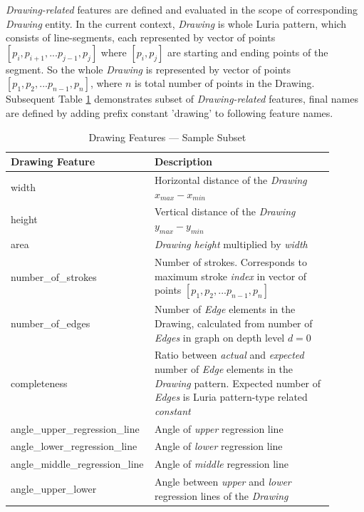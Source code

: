 \textit{Drawing-related} features are defined and evaluated in the scope of corresponding \textit{Drawing} entity. In the current context, \textit{Drawing} is whole Luria pattern, which consists of line-segments, each represented by vector of points $[p_i, p_{i+1}, ... p_{j-1}, p_j]$ where $[p_i, p_j]$ are starting and ending points of the segment. So the whole \textit{Drawing} is represented by vector of points $[p_1, p_{2}, ... p_{n-1}, p_n]$, where $n$ is total number of points in the Drawing. Subsequent Table \ref{features-drawing} demonstrates subset of \textit{Drawing-related} features, final names are defined by adding prefix constant 'drawing' to following feature names.

\begin{table}[htb]
\centering
\begin{tabular}{p{0.35\linewidth} | p{0.55\linewidth}}
\hline
Drawing Feature & Description  \\
\hline
width  & Horizontal distance of the \textit{Drawing} $x_{max} - x_{min}$  \\
height & Vertical distance of the \textit{Drawing} $y_{max} - y_{min}$ \\
area & \textit{Drawing} \textit{height} multiplied by \textit{width}  \\
number\_of\_strokes & Number of strokes. Corresponds to maximum stroke \textit{index} in vector of points $[p_1, p_{2}, ... p_{n-1}, p_n]$ \\
number\_of\_edges & Number of \textit{Edge} elements in the Drawing, calculated from number of \textit{Edges} in graph on depth level $d = 0$ \\
completeness & Ratio between \textit{actual} and \textit{expected} number of \textit{Edge} elements in the \textit{Drawing} pattern. Expected number of \textit{Edges} is Luria pattern-type related \textit{constant} \\
angle\_upper\_regression\_line & Angle of \textit{upper} regression line  \\
angle\_lower\_regression\_line & Angle of \textit{lower} regression line  \\
angle\_middle\_regression\_line & Angle of \textit{middle} regression line  \\
angle\_upper\_lower & Angle between \textit{upper} and \textit{lower} regression lines of the \textit{Drawing}\\
\hline
\end{tabular}
\caption{Drawing Features --- Sample Subset}
\label{features-drawing}
\end{table}

